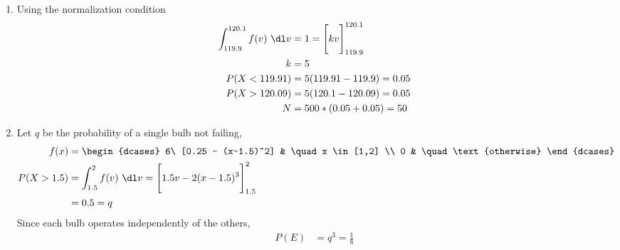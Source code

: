 \begin{enumerate}
    \item Using the normalization condition
          \begin{align}
              \int_{119.9}^{120.1} f(v)\ \dl v & = 1
              = \Bigg[ kv \Bigg]_{119.9}^{120.1}                            \\
              k                                & = 5                        \\
              P(X<119.91)                      & = 5(119.91 - 119.9) = 0.05 \\
              P(X>120.09)                      & = 5(120.1 - 120.09) = 0.05 \\
              N                                & = 500 * (0.05 + 0.05) = 50
          \end{align}

    \item Let $ q $ be the probability of a single bulb not failing,
          \begin{align}
              f(x)       & = \begin{dcases}
                                 6\ [0.25 - (x-1.5)^2] & \quad x \in [1,2]      \\
                                 0                     & \quad \text{otherwise}
                             \end{dcases} \\
              P(X > 1.5) & = \int_{1.5}^{2} f(v)\ \dl v
              = \Bigg[1.5v - 2(x-1.5)^3\Bigg]_{1.5}^2                       \\
                         & = 0.5 = q
          \end{align}
          Since each bulb operates independently of the others,
          \begin{align}
              P(E) & = q^3 = \frac{1}{8}
          \end{align}


\end{enumerate}
